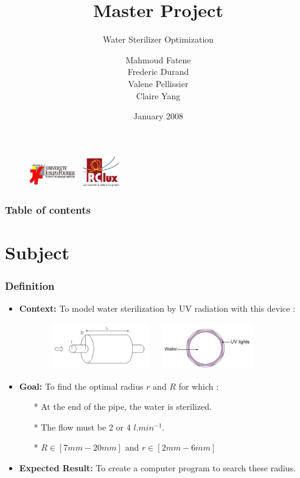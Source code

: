 \documentclass[xcolor=dvipsnames,10pt]{beamer}
\author{Mahmoud Fatene \\ Frederic Durand \\ Valene Pellissier \\ Claire Yang}
\title[Master Project]{Master Project}
\subtitle{Water Sterilizer Optimization}
\date{January 2008}
\begin{document}
\begin{frame}
	\titlepage
	\begin{figure}
	\raggedleft
	\includegraphics[height=1cm, width=2cm]{./images/logoUJF.jpg}
	\hspace{65mm}
	\raggedright
	\includegraphics[height=1.3cm, width=2cm]{./images/logoRCLux.jpg}
	\end{figure}
\end{frame}

\begin{frame}
	\frametitle{Table of contents}
	\tableofcontents
\end{frame}


\section{Subject}

\begin{frame}
	\frametitle{Definition}
\begin{itemize}[<+->]
\item \textbf{Context:} To model water sterilization by UV radiation with this device :
	\begin{figure}
		\raggedleft
		\includegraphics[width=5cm,height=2cm]{./images/sterilisateurh.jpg}
		\hspace{3mm}
		\raggedright
		\includegraphics[width=4cm,height=2cm]{./images/coupeSterilisateur.jpg}
	\end{figure}
\item \textbf{Goal:} To find the optimal radius $r$ and $R$ for which :
	\begin{itemize} 
		\item[*] At the end of the pipe, the water is sterilized.
		\item[*] The flow must be 2 or 4 $l.min^{-1}$.
		\item[*] $R \in [7mm - 20mm]$ and $r \in [2mm - 6mm]$
	\end{itemize}
\item \textbf{Expected Result:} To create a computer program to search these radius.
\end{itemize}
\end{frame}
\end{document}
